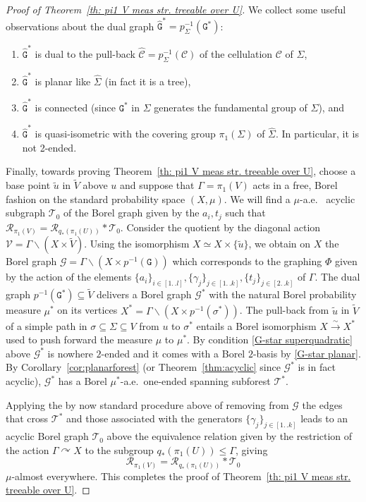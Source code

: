 \documentclass[11pt]{amsart}
\theoremstyle{definition}
\theoremstyle{plain}
\newcommand{\<}{\langle}
\renewcommand{\>}{\rangle}
\newcommand{\actson}{\curvearrowright}
\newcommand{\Ggraph}{\mathcal{G}}
\newcommand\RR{\mathscr{R}}
\newcommand\GGG{\mathtt{G}}
\newcommand\GG{\mathcal{G}}
\newcommand\TT{\mathcal{T}}
\newcommand\CC{\mathcal{C}}
\begin{document}
\begin{proof}[Proof of Theorem~\ref{th: pi1 V meas str. treeable over U}]
We collect some useful observations about the dual graph $\widehat{\GGG}^*=p_{\Sigma}^{-1}(\GGG^*)$:
\begin{enumerate}
\item
  $\widehat{\GGG}^*$ is dual to the pull-back $\widehat{\CC}=p_{\Sigma}^{-1}(\CC)$ of the cellulation $\CC$ of $\Sigma$,
\item
  $\widehat{\GGG}^*$ is planar like $\widehat{\Sigma}$ (in fact it is a tree), \label{G-star planar}
\item
  $\widehat{\GGG}^*$ is connected (since $\GGG^*$ in $\Sigma$ generates the fundamental group of $\Sigma$), and
\item
  $\widehat{\GGG}^*$ is quasi-isometric with the covering group $\pi_1(\Sigma)$ of $\widehat{\Sigma}$.
In particular, it is not 2-ended. \label{G-star superquadratic}
\end{enumerate}

Finally, towards proving Theorem~\ref{th: pi1 V meas str. treeable over U},  choose a  base point $\tilde{u}$ in $\widetilde{V}$ above $u$ and suppose that $\Gamma = \pi_1(V)$ acts in a free, Borel fashion on the standard probability space $(X,\mu)$.  We will find a $\mu$-a.e.~ acyclic subgraph $\TT_0$ of the Borel graph given by the $a_i,t_j$ such that
$\RR_{\pi_1(V)}=\RR_{q_*(\pi_1(U))}*\TT_0$.  Consider the quotient by the diagonal action $\mathcal{V}={\Gamma}\backslash (X\times \widetilde{V})$.
Using the isomorphism $X\simeq  X\times \{\tilde{u}\}$, we obtain on $X$ the Borel graph $\Ggraph= {\Gamma}\backslash (X\times p^{-1}(\GGG))$ which corresponds to the graphing $\Phi$ given by the action of the elements $\{a_i\}_{i\in [1\mathrel{{.}\,{.}}l]}  ,\{\gamma_j\}_{j\in [1\mathrel{{.}\,{.}}k]}, \{t_j\}_{j\in [2\mathrel{{.}\,{.}}k]}$ of $\Gamma$.
The dual graph  $p^{-1}(\GGG^*)\subseteq \widetilde{V}$ delivers a Borel graph $\Ggraph^*$ with the natural Borel probability measure $\mu^*$ on its vertices $X^{*}={\Gamma}\backslash (X\times p^{-1}(\sigma^*))$.  The pull-back from $\tilde{u}$ in $\widetilde{V}$ of a simple path in $\sigma\subseteq \Sigma\subseteq V$ from $u$ to $\sigma^*$ entails a Borel isomorphism $X\overset{\sim}{\to} X^*$ used to push forward the measure $\mu$ to $\mu^*$.
By condition \eqref{G-star superquadratic} above $\Ggraph^*$ is nowhere $2$-ended and it comes with a Borel $2$-basis by \eqref{G-star planar}.
By Corollary~\ref{cor:planarforest} (or Theorem~\ref{thm:acyclic} since $\Ggraph^*$ is in fact acyclic),  $\Ggraph^*$ has a Borel $\mu^*$-a.e.\ one-ended spanning subforest $\TT^*$.

Applying the by now standard procedure above of removing from $\GG$ the edges that cross $\TT^*$  and those associated with the generators $\{\gamma_j\}_{j\in [1\mathrel{{.}\,{.}}k]}$
leads to an acyclic Borel graph $\TT_0$ above the equivalence relation given by the restriction of the action $\Gamma\actson X$ to the subgroup $q_*(\pi_1(U))\leq \Gamma$, giving
$$\RR_{\pi_1(V)}=\RR_{q_*(\pi_1(U))}*\TT_0$$
 $\mu$-almost everywhere.
 This completes the proof of Theorem~\ref{th: pi1 V meas str. treeable over U}.
\end{proof}
\end{document}
